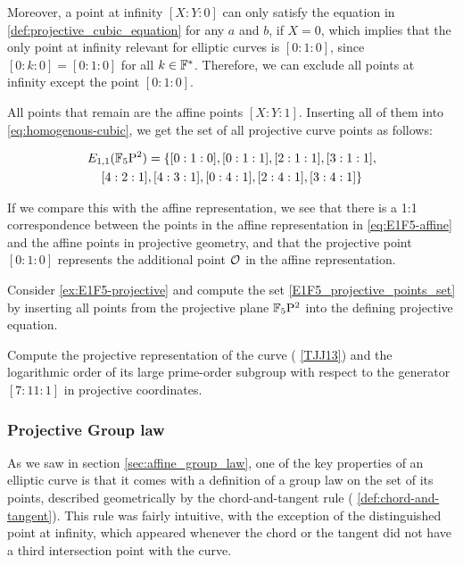 \begin{example}
Moreover, a point at infinity $[X:Y:0]$ can only satisfy the equation in \eqref{def:projective_cubic_equation} for any $a$ and $b$, if $X=0$, which implies that the only point at infinity relevant for  elliptic curves is $[0:1:0]$, since $[0:k:0]= [0:1:0]$ for all $k\in\mathbb{F}^*$. Therefore, we can exclude all points at infinity except the point $[0:1:0]$.

All points that remain are the affine points $[X:Y:1]$. Inserting all of them into \eqref{eq:homogenous-cubic}, we get the set of all projective curve points as follows:

\begin{multline}
\label{E1F5_projective_points_set}
E_{1,1}(\mathbb{F}_5\mathrm{P}^2)=\{[0:1:0], [0:1:1], [2:1:1], [3:1:1], \\ [4:2:1], [4:3:1], [0:4:1], [2:4:1], [3:4:1]\}
\end{multline}

If we compare this with the affine representation, we see that there is a 1:1 correspondence between the points in the affine representation in \eqref{eq:E1F5-affine} and the affine points in projective geometry, and that the projective point $[0:1:0]$ represents the additional point $\mathcal{O}$ in the affine representation.
\end{example} 

\begin{exercise}
Consider \examplename{} \ref{ex:E1F5-projective} and compute the set \eqref{E1F5_projective_points_set} by inserting all points from the projective plane $\mathbb{F}_5\mathrm{P}^2$ into the defining projective  equation.
\end{exercise}

\begin{exercise}
Compute the projective representation of the  curve (\examplename{} \ref{TJJ13}) and the logarithmic order of its large prime-order subgroup with respect to the generator $[7:11:1]$ in projective coordinates.
\end{exercise}

\subsubsection{Projective Group law}
\label{sec:projective_group_law}
As we saw in section \ref{sec:affine_group_law}, one of the key properties of an elliptic curve is that it comes with a definition of a group law on the set of its points, described geometrically by the chord-and-tangent rule ( \ref{def:chord-and-tangent}). This rule was fairly intuitive, with the exception of the distinguished point at infinity, which appeared whenever the chord or the tangent did not have a third intersection point with the curve.


